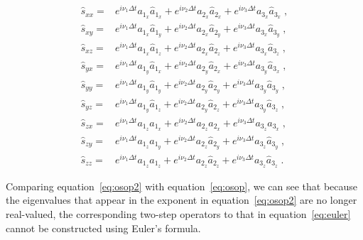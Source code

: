 \begin{eqnarray}
    \label{eq:exps2}
    \hat{s}_{xx} =& e^{i \nu_1 \Delta t} a_{1_x} \hat{a}_{1_x} + e^{i \nu_2 \Delta t} a_{2_x} \hat{a}_{2_x} + e^{i \nu_3 \Delta t} a_{3_x} \hat{a}_{3_x} \;, \\ \nonumber
    \hat{s}_{xy} =& e^{i \nu_1 \Delta t} a_{1_x} \hat{a}_{1_y} + e^{i \nu_2 \Delta t} a_{2_x} \hat{a}_{2_y} + e^{i \nu_3 \Delta t} a_{3_x} \hat{a}_{3_y} \;, \\ \nonumber
    \hat{s}_{xz} =& e^{i \nu_1 \Delta t} a_{1_x} \hat{a}_{1_z} + e^{i \nu_2 \Delta t} a_{2_x} \hat{a}_{2_z} + e^{i \nu_3 \Delta t} a_{3_x} \hat{a}_{3_z} \;, \\ \nonumber
    \hat{s}_{yx} =& e^{i \nu_1 \Delta t} a_{1_y} \hat{a}_{1_x} + e^{i \nu_2 \Delta t} a_{2_y} \hat{a}_{2_x} + e^{i \nu_3 \Delta t} a_{3_y} \hat{a}_{3_x} \;, \\ \nonumber
    \hat{s}_{yy} =& e^{i \nu_1 \Delta t} a_{1_y} \hat{a}_{1_y} + e^{i \nu_2 \Delta t} a_{2_y} \hat{a}_{2_y} + e^{i \nu_3 \Delta t} a_{3_y} \hat{a}_{3_y} \;, \\ \nonumber
    \hat{s}_{yz} =& e^{i \nu_1 \Delta t} a_{1_y} \hat{a}_{1_z} + e^{i \nu_2 \Delta t} a_{2_y} \hat{a}_{2_z} + e^{i \nu_3 \Delta t} a_{3_y} \hat{a}_{3_z} \;, \\ \nonumber
    \hat{s}_{zx} =& e^{i \nu_1 \Delta t} a_{1_z} \hat{a}_{1_x} + e^{i \nu_2 \Delta t} a_{2_z} \hat{a}_{2_x} + e^{i \nu_3 \Delta t} a_{3_z} \hat{a}_{3_x} \;, \\ \nonumber
    \hat{s}_{zy} =& e^{i \nu_1 \Delta t} a_{1_z} \hat{a}_{1_y} + e^{i \nu_2 \Delta t} a_{2_z} \hat{a}_{2_y} + e^{i \nu_3 \Delta t} a_{3_z} \hat{a}_{3_y} \;, \\ \nonumber
    \hat{s}_{zz} =& e^{i \nu_1 \Delta t} a_{1_z} \hat{a}_{1_z} + e^{i \nu_2 \Delta t} a_{2_z} \hat{a}_{2_z} + e^{i \nu_3 \Delta t} a_{3_z} \hat{a}_{3_z} \;.
\end{eqnarray}

Comparing equation~\ref{eq:osop2} with equation~\ref{eq:osop}, we can see that because the eigenvalues that appear in the exponent in equation~\ref{eq:osop2} are no longer real-valued, the corresponding two-step operators to that in equation~\ref{eq:euler} cannot be constructed using Euler's formula.

